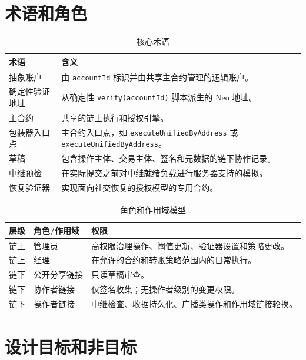 \documentclass[11pt]{article}
\newcommand{\code}[1]{\texttt{#1}}
\begin{document}
\section{术语和角色}
\begin{table}[h!]
  \centering
  \caption{核心术语}
  \begin{tabularx}{\textwidth}{>{\raggedright\arraybackslash}p{}X}
    \toprule
    术语 & 含义 \\
    \midrule
    抽象账户 & 由 \code{accountId} 标识并由共享主合约管理的逻辑账户。 \\
    确定性验证地址 & 从确定性 \code{verify(accountId)} 脚本派生的 Neo 地址。 \\
    主合约 & 共享的链上执行和授权引擎。 \\
    包装器入口点 & 主合约入口点，如 \code{executeUnifiedByAddress} 或 \code{executeUnifiedByAddress}。 \\
    草稿 & 包含操作主体、交易主体、签名和元数据的链下协作记录。 \\
    中继预检 & 在实际提交之前对中继就绪负载进行服务器支持的模拟。 \\
    恢复验证器 & 实现面向社交恢复的授权模型的专用合约。 \\
    \bottomrule
  \end{tabularx}
\end{table}

\begin{table}[h!]
  \centering
  \caption{角色和作用域模型}
  \begin{tabularx}{\textwidth}{>{\raggedright\arraybackslash}p{}>{\raggedright\arraybackslash}p{}X}
    \toprule
    层级 & 角色/作用域 & 权限 \\
    \midrule
    链上 & 管理员 & 高权限治理操作、阈值更新、验证器设置和策略更改。 \\
    链上 & 经理 & 在允许的合约和转账策略范围内的日常执行。 \\
    链下 & 公开分享链接 & 只读草稿审查。 \\
    链下 & 协作者链接 & 仅签名收集；无操作者级别的变更权限。 \\
    链下 & 操作者链接 & 中继检查、收据持久化、广播类操作和作用域链接轮换。 \\
    \bottomrule
  \end{tabularx}
\end{table}

\section{设计目标和非目标}
\end{document}
